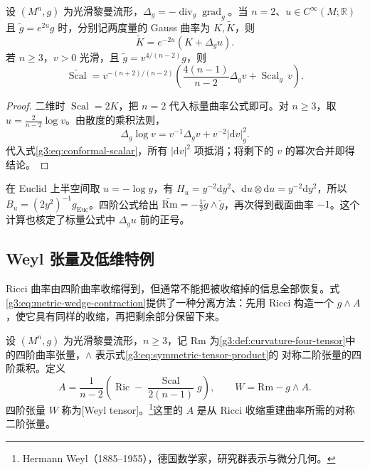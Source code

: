 \begin{corollary}\label{g3:cor:conformal-scalar-power}
	设 \((M^n,g)\) 为光滑黎曼流形，\(\Delta_g=-\operatorname{div}_g\operatorname{grad}_g\)。当 \(n=2\)、\(u\in C^\infty(M;\mathbb R)\) 且 \(\widetilde g=e^{2u}g\) 时，分别记两度量的 Gauss 曲率为 \(K,\widetilde K\)，则
	\[
		\widetilde K=e^{-2u}(K+\Delta_gu).
	\]
	若 \(n\ge3\)，\(v>0\) 光滑，且 \(\widetilde g=v^{4/(n-2)}g\)，则
	\begin{equation}\label{g3:eq:conformal-scalar-power}
		\widetilde{\operatorname{Scal}}
		=v^{-(n+2)/(n-2)}
		\left(\frac{4(n-1)}{n-2}\Delta_gv+\operatorname{Scal}_g\,v\right).
	\end{equation}
\end{corollary}
\begin{proof}
	二维时 \(\operatorname{Scal}=2K\)，把 \(n=2\) 代入标量曲率公式即可。对 \(n\ge3\)，取 \(u=\tfrac2{n-2}\log v\)。由散度的乘积法则，
	\[
		\Delta_g\log v=v^{-1}\Delta_gv+v^{-2}|\mathrm dv|_g^2.
	\]
	代入式\eqref{g3:eq:conformal-scalar}，所有 \(|\mathrm dv|^2\) 项抵消；将剩下的 \(v\) 的幂次合并即得结论。
\end{proof}

在 Euclid 上半空间取 \(u=-\log y\)，有 \(H_u=y^{-2}\mathrm dy^2\)、\(\mathrm du\otimes\mathrm du=y^{-2}\mathrm dy^2\)，所以 \(B_u=(2y^2)^{-1}g_{\mathrm{Euc}}\)。四阶公式给出 \(\widetilde{\mathrm{Rm}}=-\tfrac12\widetilde g\wedge\widetilde g\)，再次得到截面曲率 \(-1\)。这个计算也核定了标量公式中 \(\Delta_gu\) 前的正号。

\subsection{Weyl 张量及低维特例}
\label{g3:subsec:0304:03}

Ricci 曲率由四阶曲率收缩得到，但通常不能把被收缩掉的信息全部恢复。式\eqref{g3:eq:metric-wedge-contraction}提供了一种分离方法：先用 Ricci 构造一个 \(g\wedge A\)，使它具有同样的收缩，再把剩余部分保留下来。

\begin{definition}\label{g3:def:weyl-tensor}
	设 \((M^n,g)\) 为光滑黎曼流形，\(n\ge3\)，记 \(\mathrm{Rm}\) 为\cref{g3:def:curvature-four-tensor}中的四阶曲率张量，\(\wedge\) 表示式\eqref{g3:eq:symmetric-tensor-product}的 对称二阶张量的四阶乘积。定义
	\[
		A=\frac1{n-2}\left(\operatorname{Ric}-
		\frac{\operatorname{Scal}}{2(n-1)}g\right),\qquad
		W=\mathrm{Rm}-g\wedge A.
	\]
	四阶张量 \(W\) 称为[Weyl tensor]。\footnote{Hermann Weyl（1885--1955），德国数学家，研究群表示与微分几何。}这里的 \(A\) 是从 Ricci 收缩重建曲率所需的对称二阶张量。
\end{definition}

